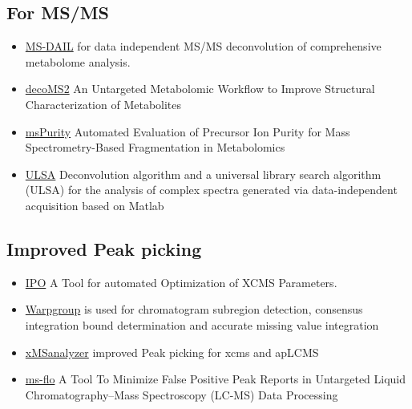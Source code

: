 \documentclass[
]{book}
\begin{document}
\hypertarget{for-msms}{%
\subsection{For MS/MS}\label{for-msms}}

\begin{itemize}
\item
  \href{http://prime.psc.riken.jp/Metabolomics_Software/}{MS-DAIL} for data independent MS/MS deconvolution of comprehensive metabolome analysis.\citep{tsugawa2015}
\item
  \href{https://pubs.acs.org/doi/10.1021/ac400751j}{decoMS2} An Untargeted Metabolomic Workflow to Improve Structural Characterization of Metabolites\citep{nikolskiy2013}
\item
  \href{https://pubs.acs.org/doi/10.1021/acs.analchem.6b04358}{msPurity} Automated Evaluation of Precursor Ion Purity for Mass Spectrometry-Based Fragmentation in Metabolomics\citep{lawson2017}
\item
  \href{https://pubs.acs.org/doi/suppl/10.1021/acs.est.8b00259/suppl_file/es8b00259_si_001.pdf}{ULSA} Deconvolution algorithm and a universal library search algorithm (ULSA) for the analysis of complex spectra generated via data-independent acquisition based on Matlab \citep{samanipour2018}
\end{itemize}

\hypertarget{improved-peak-picking}{%
\subsection{Improved Peak picking}\label{improved-peak-picking}}

\begin{itemize}
\item
  \href{https://github.com/rietho/IPO}{IPO} A Tool for automated Optimization of XCMS Parameters\citep{libiseller2015}.
\item
  \href{https://github.com/nathaniel-mahieu/warpgroup}{Warpgroup} is used for chromatogram subregion detection, consensus integration bound determination and accurate missing value integration\citep{mahieu2016}
\item
  \href{https://bmcbioinformatics.biomedcentral.com/articles/10.1186/1471-2105-14-15}{xMSanalyzer} improved Peak picking for xcms and apLCMS\citep{uppal2013}
\item
  \href{https://bitbucket.org/fiehnlab/ms-flo/src/657d85ec7bdd?at=master}{ms-flo} A Tool To Minimize False Positive Peak Reports in Untargeted Liquid Chromatography--Mass Spectroscopy (LC-MS) Data Processing\citep{defelice2017}
\end{itemize}
\end{document}

